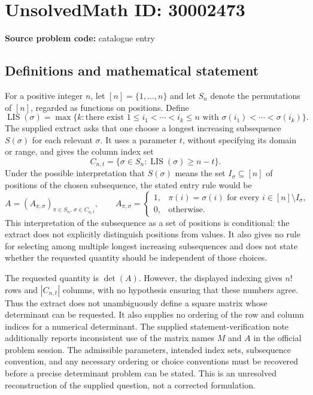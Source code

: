 \documentclass[11pt]{article}
\begin{document}
\section*{UnsolvedMath ID: 30002473}
\textbf{Source problem code:} catalogue entry
\subsection{Definitions and mathematical statement}
For a positive integer \(n\), let \([n]=\{1,\ldots,n\}\) and let \(S_n\) denote the permutations of \([n]\), regarded as functions on positions. Define
\[
\operatorname{LIS}(\sigma)=\max\bigl\{k:\text{there exist }1\le i_1<\cdots<i_k\le n\text{ with }\sigma(i_1)<\cdots<\sigma(i_k)\bigr\}.
\]
The supplied extract asks that one choose a longest increasing subsequence \(S(\sigma)\) for each relevant \(\sigma\). It uses a parameter \(t\), without specifying its domain or range, and gives the column index set
\[
C_{n,t}=\{\sigma\in S_n:\operatorname{LIS}(\sigma)\ge n-t\}.
\]
Under the possible interpretation that \(S(\sigma)\) means the set \(I_\sigma\subseteq[n]\) of positions of the chosen subsequence, the stated entry rule would be
\[
A=(A_{\pi,\sigma})_{\pi\in S_n,\,\sigma\in C_{n,t}},\qquad
A_{\pi,\sigma}=\begin{cases}
1,&\pi(i)=\sigma(i)\text{ for every }i\in[n]\setminus I_\sigma,\\
0,&\text{otherwise}.
\end{cases}
\]
This interpretation of the subsequence as a set of positions is conditional: the extract does not explicitly distinguish positions from values. It also gives no rule for selecting among multiple longest increasing subsequences and does not state whether the requested quantity should be independent of those choices.

The requested quantity is \(\det(A)\). However, the displayed indexing gives \(n!\) rows and \(|C_{n,t}|\) columns, with no hypothesis ensuring that these numbers agree. Thus the extract does not unambiguously define a square matrix whose determinant can be requested. It also supplies no ordering of the row and column indices for a numerical determinant. The supplied statement-verification note additionally reports inconsistent use of the matrix names \(M\) and \(A\) in the official problem session. The admissible parameters, intended index sets, subsequence convention, and any necessary ordering or choice conventions must be recovered before a precise determinant problem can be stated. This is an unresolved reconstruction of the supplied question, not a corrected formulation.
\end{document}
